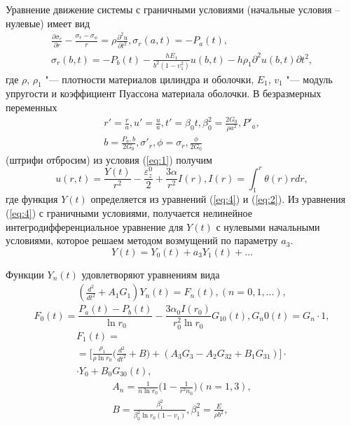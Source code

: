 Уравнение движение системы с граничными условиями (начальные условия – нулевые) имеет вид 
\begin{equation}\label{eq:4}
    \begin{gathered}
        \frac{\partial\sigma_r}{\partial r}-\frac{\sigma_r-\sigma_\phi}{r}=\rho\frac{\partial^2u}{\partial t^2}, \sigma_r(a,t)=-P_a(t), \\
        \sigma_r(b,t)=-P_b(t)-\frac{hE_1}{b^2 (1-\upsilon^2_1)}u(b,t)-h\rho_1{\partial^2u(b,t)}{\partial t^2},
    \end{gathered}
\end{equation}
\noindent где $\rho$, $\rho_1$ "--- плотности материалов цилиндра и оболочки,
$E_1$, $v_1$ "--- модуль упругости и коэффициент Пуассона материала оболочки. В безразмерных переменных
\begin{equation*}
    \begin{gathered}
        r'=\frac{r}{a}, u'=\frac{u}{a}, t'=\beta_0t, \beta^2_0=\frac{2G_0}{\rho a^2}, P'_a, \\
        b=\frac{P_a,b}{2G_0}, \sigma'_r,\phi=\sigma_r,\frac{\phi}{2G_0}
    \end{gathered}
\end{equation*}
(штрифи отбросим) из условия (\ref{eq:1}) получим 
$$
u(r,t)=\frac{Y(t)}{r^2}-\frac{\varepsilon^0_z}{2}+\frac{3\alpha}{r^2}I(r), I(r)=\int^{r}_{1} \theta(r)rdr,
$$
\noindent где функция $Y(t)$ определяется из уравнений (\ref{eq:4}) и (\ref{eq:2}). Из уравнения (\ref{eq:4}) с граничными условиями,
получается нелинейное интегродифференциальное уравнение для $Y(t)$ с нулевыми начальными условиями, которое решаем методом возмущений по параметру $a_3$.
$$
Y(t)=Y_0(t)+a_3Y_1(t)+\ldots
$$

Функции $Y_n(t)$ удовлетворяют уравнениям вида
\begin{equation}\label{eq:5}
    \begin{gathered}
        (\frac{d^2}{dt^2}+A_1 G_1)Y_n(t)=F_n(t), (n=0,1,...),
    \end{gathered}
\end{equation}
$$
F_0(t)=\frac{P_a(t)-P_b(t)}{\ln r_0}-\frac{3\alpha_0I(r_0)}{r^2_0\ln r_0}G_10(t), G_n0(t)=G_n \cdot 1,
$$
\begin{equation*}
    \begin{gathered}
        F_1(t)= \\
        =\bigg[\frac{\rho_1}{\rho\ln r_0}\bigg(\frac{d^2}{dt^2}+B\bigg)+(A_3 G_3 - A_2 G_{32} + B_1 G_{31})\bigg] \cdot \\
        \cdot Y_0+B_0 G_{30}(t),
    \end{gathered}
\end{equation*}
\begin{equation*}
    \begin{gathered}
        A_n=\frac{1}{n\ln r_0}\bigg(1-\frac{1}{r^2n_0}\bigg) (n=1,3), \\
        B=\frac{\beta^2_1}{\beta^2_0\ln r_0(1-v_1)}, \beta^2_1=\frac{E}{\rho b^2},
    \end{gathered}
\end{equation*}

